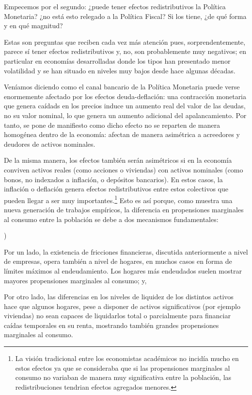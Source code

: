 \documentclass[10pt,a4paper]{article}
\newcounter{alphaitem}
\newenvironment{la}
      {\begin{list}{\alph{alphaitem})}{%
          \usecounter{alphaitem}%
          \setlength{\leftmargin}{1cm}%
          \setlength{\parskip}{3pt}%
          \setlength{\itemsep}{0pt}%
          \setlength{\parsep}{0pt}%
      }}
      {\end{list}}
\begin{document}
Empecemos por el segundo: ¿puede tener efectos redistributivos la Política Monetaria? ¿no está esto relegado a la Política Fiscal? Si los tiene, ¿de qué forma y en qué magnitud?

Estas son preguntas que reciben cada vez más atención pues, sorprendentemente, parece sí tener efectos redistributivos y, no, son probablemente muy negativos; en particular en economías desarrolladas donde los tipos han presentado menor volatilidad y se han situado en niveles muy bajos desde hace algunas décadas.

Veníamos diciendo como el canal bancario de la Política Monetaria puede verse enormemente afectado por los efectos deuda-deflación: una contracción monetaria que genera caídads en los precios induce un aumento real del valor de las deudas, no su valor nominal, lo que genera un aumento adicional del apalancamiento. Por tanto, se pone de manifiesto como dicho efecto no se reparten de manera homogénea dentro de la economía: afectan de manera asimétrica a acreedores y deudores de activos nominales. 

De la misma manera, los efectos también serán asimétricos si en la economía conviven activos reales (como acciones o viviendas) con activos nominales (como bonos, no indexados a inflación, o depósitos bancarios). En estos casos, la inflación o deflación genera efectos redistributivos entre estos colectivos que pueden llegar a ser muy importantes.\footnote{%
    La visión tradicional entre los economistas académicos no incidía mucho en estos efectos ya que se consideraba que si las propensiones marginales al consumo no variaban de manera muy significativa entre la población, las redistribuciones tendrian efectos agregados menores.
} Esto es así porque, como muestra una nueva generación de trabajos empíricos, la diferencia en propensiones marginales al consumo entre la población se debe a dos mecanismos fundamentales:
\begin{la}
    \item Por un lado, la existencia de fricciones financieras, discutida anteriormente a nivel de empresas, opera también a nivel de hogares, en muchos casos en forma de límites máximos al endeudamiento. Los hogares más endeudados suelen mostrar mayores propensiones marginales al consumo; y,
    \item Por otro lado, las diferencias en los niveles de liquidez de los distintos activos hace que algunos hogares, pese a disponer de activos significativos (por ejemplo viviendas) no sean capaces de liquidarlos total o parcialmente para financiar caídas temporales en su renta, mostrando también grandes propensiones marginales al consumo.
\end{la}
\end{document}
